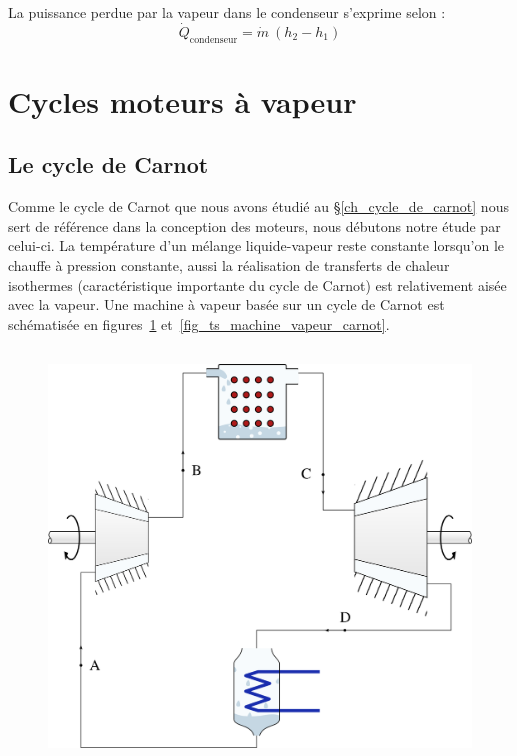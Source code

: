 		La puissance perdue par la vapeur dans le condenseur s’exprime selon :
		\begin{equation}
			\dot{Q}_\text{condenseur} = \dot{m} \ (h_2 - h_1)
		\end{equation}


\section{Cycles moteurs à vapeur}
\label{ch_cycles_moteurs_vapeur}

	\subsection{Le cycle de Carnot}

		Comme le cycle de Carnot que nous avons étudié au \S\ref{ch_cycle_de_carnot} nous sert de référence dans la conception des moteurs, nous débutons notre étude par celui-ci. La température d’un mélange liquide-vapeur reste constante lorsqu’on le chauffe à pression constante, aussi la réalisation de transferts de chaleur isothermes (caractéristique importante du cycle de Carnot) est relativement aisée avec la vapeur. Une machine à vapeur basée sur un cycle de Carnot est schématisée en figures~\ref{fig_machine_vapeur_carnot} et~\ref{fig_ts_machine_vapeur_carnot}.

		\begin{figure}
			\begin{center}
				\includegraphics[height=11cm]{images/circuit_carnot_lv.png}
			\end{center}
			\label{fig_machine_vapeur_carnot}
		\end{figure}

